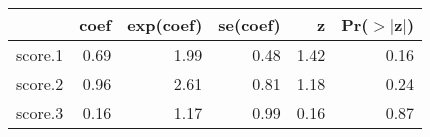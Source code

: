 \begin{table}[ht]
\centering
\begin{tabular}{rrrrrr}
  \hline
 & coef & exp(coef) & se(coef) & z & Pr($>$$|$z$|$) \\ 
  \hline
score.1 & 0.69 & 1.99 & 0.48 & 1.42 & 0.16 \\ 
  score.2 & 0.96 & 2.61 & 0.81 & 1.18 & 0.24 \\ 
  score.3 & 0.16 & 1.17 & 0.99 & 0.16 & 0.87 \\ 
   \hline
\end{tabular}
\end{table}
